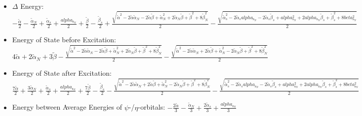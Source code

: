 \documentclass[12pt,a4paper]{article}
\begin{document}
\begin{itemize}
                \item $\Delta$ Energy: $- \frac{\tilde{\alpha}}{2} - \frac{\tilde{\alpha}_{N}}{2} + \frac{\tilde{\alpha}_{s}}{2} + \frac{alpha_{\text{s}_N}}{2} + \frac{\tilde{\beta}}{2} - \frac{\tilde{\beta}_{s}}{2} + \frac{\sqrt{\tilde{\alpha}^{2} - 2 \tilde{\alpha} \tilde{\alpha}_{N} - 2 \tilde{\alpha} \tilde{\beta} + \tilde{\alpha}_{N}^{2} + 2 \tilde{\alpha}_{N} \tilde{\beta} + \tilde{\beta}^{2} + 8 \tilde{\beta}_{N}^{2}}}{2} - \frac{\sqrt{\tilde{\alpha}_{s}^{2} - 2 \tilde{\alpha}_{s} alpha_{\text{s}_N} - 2 \tilde{\alpha}_{s} \tilde{\beta}_{s} + alpha_{\text{s}_N}^{2} + 2 alpha_{\text{s}_N} \tilde{\beta}_{s} + \tilde{\beta}_{s}^{2} + 8 beta_{\text{s}_N}^{2}}}{2}$
                \item Energy of State before Excitation: $4 \tilde{\alpha} + 2 \tilde{\alpha}_{N} + 3 \tilde{\beta} - \frac{\sqrt{\tilde{\alpha}^{2} - 2 \tilde{\alpha} \tilde{\alpha}_{N} - 2 \tilde{\alpha} \tilde{\beta} + \tilde{\alpha}_{N}^{2} + 2 \tilde{\alpha}_{N} \tilde{\beta} + \tilde{\beta}^{2} + 8 \tilde{\beta}_{N}^{2}}}{2} - \frac{\sqrt{\tilde{\alpha}^{2} - 2 \tilde{\alpha} \tilde{\alpha}_{N} + 2 \tilde{\alpha} \tilde{\beta} + \tilde{\alpha}_{N}^{2} - 2 \tilde{\alpha}_{N} \tilde{\beta} + \tilde{\beta}^{2} + 8 \tilde{\beta}_{N}^{2}}}{2}$
                \item Energy of State after Excitation: $\frac{7 \tilde{\alpha}}{2} + \frac{3 \tilde{\alpha}_{N}}{2} + \frac{\tilde{\alpha}_{s}}{2} + \frac{alpha_{\text{s}_N}}{2} + \frac{7 \tilde{\beta}}{2} - \frac{\tilde{\beta}_{s}}{2} - \frac{\sqrt{\tilde{\alpha}^{2} - 2 \tilde{\alpha} \tilde{\alpha}_{N} + 2 \tilde{\alpha} \tilde{\beta} + \tilde{\alpha}_{N}^{2} - 2 \tilde{\alpha}_{N} \tilde{\beta} + \tilde{\beta}^{2} + 8 \tilde{\beta}_{N}^{2}}}{2} - \frac{\sqrt{\tilde{\alpha}_{s}^{2} - 2 \tilde{\alpha}_{s} alpha_{\text{s}_N} - 2 \tilde{\alpha}_{s} \tilde{\beta}_{s} + alpha_{\text{s}_N}^{2} + 2 alpha_{\text{s}_N} \tilde{\beta}_{s} + \tilde{\beta}_{s}^{2} + 8 beta_{\text{s}_N}^{2}}}{2}$
                \item Energy between Average Energies of $\psi$-/$\eta$-orbitals: $- \frac{2 \tilde{\alpha}}{3} - \frac{\tilde{\alpha}_{N}}{3} + \frac{2 \tilde{\alpha}_{s}}{3} + \frac{alpha_{\text{s}_N}}{3}$
            

\end{itemize}
\end{document}
